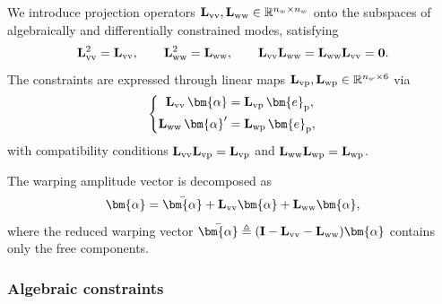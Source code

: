We introduce projection operators $\mathbf{L}_{\rm vv},\mathbf{L}_{\rm ww}\in\mathbb{R}^{n_w\times n_w}$ onto the subspaces of algebraically and differentially constrained modes, satisfying
\[
  \mathbf{L}_{\rm vv}^2 = \mathbf{L}_{\rm vv}, \qquad
  \mathbf{L}_{\rm ww}^2 = \mathbf{L}_{\rm ww}, \qquad
  \mathbf{L}_{\rm vv}\mathbf{L}_{\rm ww}
    = \mathbf{L}_{\rm ww}\mathbf{L}_{\rm vv}
    = \mathbf{0}.
\]
The constraints are expressed through linear maps
$\mathbf{L}_{\rm vp},\mathbf{L}_{\rm wp}\in\mathbb{R}^{n_w\times 6}$ via
%
\begin{equation}
  \left\{
  \begin{aligned}
    \mathbf{L}_{\rm vv}\,\bm{\alpha} &= \mathbf{L}_{\rm vp}\,\bm{e}_{\mathrm{p}}, \\
    \mathbf{L}_{\rm ww}\,\bm{\alpha}' &= \mathbf{L}_{\rm wp}\,\bm{e}_{\mathrm{p}},
  \end{aligned}
  \right.
\end{equation}
%
with compatibility conditions
$\mathbf{L}_{\rm vv}\mathbf{L}_{\rm vp} = \mathbf{L}_{\rm vp}$ and
$\mathbf{L}_{\rm ww}\mathbf{L}_{\rm wp} = \mathbf{L}_{\rm wp}$.

The warping amplitude vector is decomposed as
\begin{equation}
  \bm{\alpha}
    = \bar{\bm{\alpha}}
      + \mathbf{L}_{\rm vv}\bm{\alpha}
      + \mathbf{L}_{\rm ww}\bm{\alpha},
  \label{eq:decompose-alpha}
\end{equation}
where the reduced warping vector
$\bar{\bm{\alpha}} \triangleq (\mathbf{I}-\mathbf{L}_{\rm vv}-\mathbf{L}_{\rm ww})\bm{\alpha}$
contains only the free components.

\subsubsection{Algebraic constraints}

